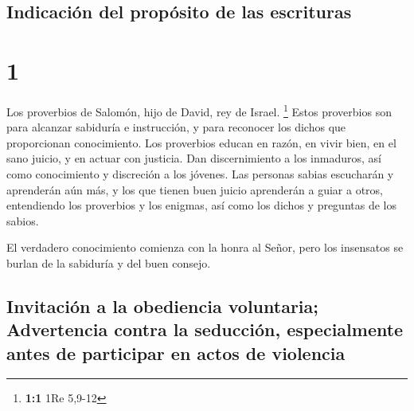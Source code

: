 \hypertarget{indicaciuxf3n-del-propuxf3sito-de-las-escrituras}{%
\subsection{Indicación del propósito de las
escrituras}\label{indicaciuxf3n-del-propuxf3sito-de-las-escrituras}}

\hypertarget{section}{%
\section{1}\label{section}}

 Los proverbios de Salomón, hijo de David, rey de Israel.
\footnote{\textbf{1:1} 1Re 5,9-12}  Estos proverbios son
para alcanzar sabiduría e instrucción, y para reconocer los dichos que
proporcionan conocimiento.  Los proverbios educan en
razón, en vivir bien, en el sano juicio, y en actuar con justicia.
 Dan discernimiento a los inmaduros, así como conocimiento
y discreción a los jóvenes.  Las personas sabias
escucharán y aprenderán aún más, y los que tienen buen juicio aprenderán
a guiar a otros,  entendiendo los proverbios y los
enigmas, así como los dichos y preguntas de los sabios.

 El verdadero conocimiento comienza con la honra al Señor,
pero los insensatos se burlan de la sabiduría y del buen consejo.

\hypertarget{invitaciuxf3n-a-la-obediencia-voluntaria-advertencia-contra-la-seducciuxf3n-especialmente-antes-de-participar-en-actos-de-violencia}{%
\subsection{Invitación a la obediencia voluntaria; Advertencia contra la
seducción, especialmente antes de participar en actos de
violencia}\label{invitaciuxf3n-a-la-obediencia-voluntaria-advertencia-contra-la-seducciuxf3n-especialmente-antes-de-participar-en-actos-de-violencia}}

